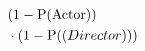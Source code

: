 $\!\begin{aligned}
  &(1 - \operatorname{P}(\text{Actor})) \\
  &\cdot (1 - \operatorname{P}(\text(Director)))
\end{aligned}$
